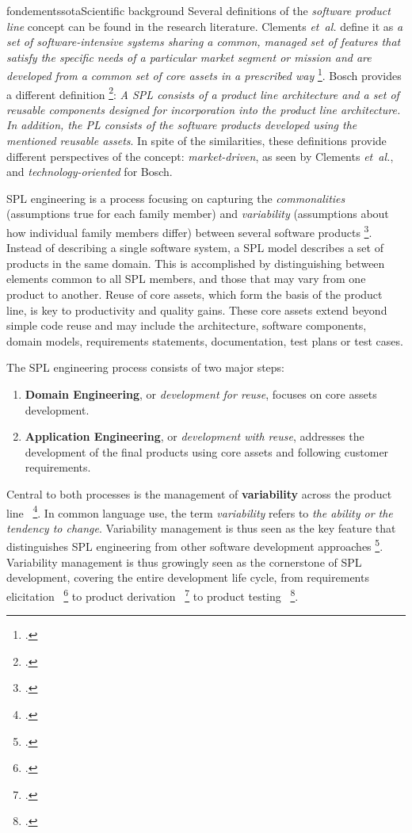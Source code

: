 \documentclass{ra2018}
\begin{document}
\begin{module}{fondements}{sota}{Scientific background}
Several definitions of the \emph{software product line} concept can be found
in the research literature. Clements \textit{et~al.} define it as \textit{a set of
software-intensive systems sharing a common, managed set of features that
satisfy the specific needs of a particular market segment or mission and are
developed from a common set of core assets in a prescribed way}
  \footcite{Northrop2002}. Bosch provides a different definition   \footcite{Bosch2000}:
\textit{A SPL consists of a product line architecture and a set of reusable
components designed for incorporation into the product line architecture. In
addition, the PL consists of the software products developed using the
mentioned reusable assets}. In spite of the similarities, these definitions
provide different perspectives of the concept: \textit{market-driven}, as seen
by Clements \textit{et~al.}, and \textit{technology-oriented} for Bosch.

SPL engineering is a process focusing on capturing the \textit{commonalities}
(assumptions true for each family member) and \textit{variability}
(assumptions about how individual family members differ) between several
software products   \footcite{Coplien1998}. Instead of describing a single software
system, a SPL model describes a set of products in the same domain. This is
accomplished by distinguishing between elements common to all SPL members, and
those that may vary from one product to another. Reuse of core assets, which
form the basis of the product line, is key to productivity and quality
gains. These core assets extend beyond simple code reuse and may include the
architecture, software components, domain models, requirements statements,
documentation, test plans or test cases.


The SPL engineering process consists of two major steps:
\begin{enumerate}
\item \textbf{Domain Engineering}, or \emph{development for reuse}, focuses on
core assets development.
\item \textbf{Application Engineering}, or \emph{development with reuse},
addresses the development of the final products using core assets and
following customer requirements.
\end{enumerate}

Central to both processes is the management of \textbf{variability} across
the product line~  \footcite{halmans2003}. In common language use, the term
\textit{variability} refers to \textit{the ability or the tendency to
change}. Variability management is thus seen as the key feature that
distinguishes SPL engineering from other software development approaches
  \footcite{Bosch2002}. Variability management is thus growingly seen as the
cornerstone of SPL development, covering the entire development life cycle,
from requirements elicitation~  \footcite{Jean-ChristopheTRIGAUX2003} to product
derivation~  \footcite{Ziadi2006a} to product testing~  \footcite{nebut03b,Nebut06b}. 
 


\end{module}
\end{document}

